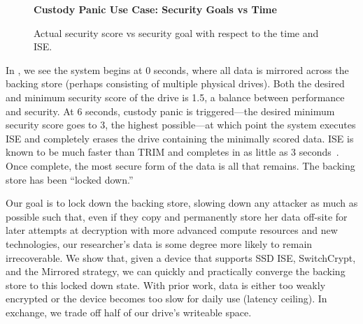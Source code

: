\begin{figure}[ht] \textbf{Custody Panic Use Case: Security Goals vs Time}\par\medskip
   \centering
   {} \caption{Actual security score vs
   security goal with respect to the time and ISE.}
  \label{fig:usecase-custody}
\end{figure}

In , we see the system begins at 0 seconds, where
all data is mirrored across the backing store (perhaps consisting of multiple
physical drives). Both the desired and minimum security score of the drive is
1.5, a balance between performance and security. At 6 seconds, custody panic is
triggered---the desired minimum security score goes to 3, the highest
possible---at which point the system executes ISE and completely erases the
drive containing the minimally scored data. ISE is known to be much faster than
TRIM and completes in as little as 3
seconds~\cite{SeaGate,Samsung,ThatOtherOEM}. Once complete, the most secure form
of the data is all that remains. The backing store has been ``locked down.''

Our goal is to lock down the backing store, slowing down any attacker as
much as possible such that, even if they copy and permanently store her data
off-site for later attempts at decryption with more advanced compute resources
and new technologies, our researcher's data is some degree more likely to remain
irrecoverable. We show that, given a device that supports SSD ISE, SwitchCrypt,
and the Mirrored strategy, we can quickly and practically converge the backing
store to this locked down state. With prior work, data is either too weakly
encrypted or the device becomes too slow for daily use (latency ceiling). In
exchange, we trade off half of our drive's writeable space.
